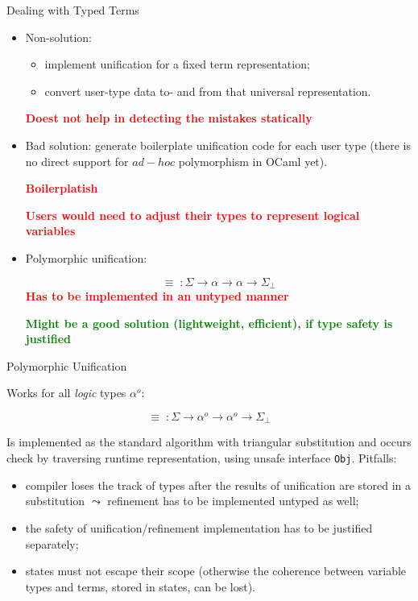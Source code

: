 \documentclass[10pt, mathserif]{beamer}
\newcommand{\oo}[1]{{#1}^o}
\theoremstyle{definition}
\begin{document}
\begin{frame}[fragile]{Dealing with Typed Terms}
\pause
\begin{itemize}
  \item Non-solution: 
     \begin{itemize}
        \item implement unification for a fixed term representation;
        \item convert user-type data to- and from that universal representation.
      \end{itemize}\pause
      {\small\bf\textcolor{red}{Doest not help in detecting the mistakes statically}}\pause 
  \item Bad solution: generate boilerplate unification code for each user type 
      (there is no direct support for $ad-hoc$ polymorphism in OCaml yet).\pause
      
      {\small\textcolor{red}{\bf Boilerplatish}}\pause

      {\small\textcolor{red}{\bf Users would need to adjust their types to represent logical variables}}\pause
  \item Polymorphic unification:

    $$
     \equiv\;\colon \Sigma\to\alpha\to\alpha\to\Sigma_{\perp}
    $$\pause
    \small
    {\bf\textcolor{red}{Has to be implemented in an untyped manner}}
    \pause

    {\bf\textcolor{green}{Might be a good solution (lightweight, efficient), if  
    type safety is justified}}
\end{itemize}

\end{frame}

\begin{frame}[fragile]{Polymorphic Unification}

Works for all \emph{logic} types $\oo{\alpha}$:

$$
\equiv\;\colon \Sigma\to\oo{\alpha}\to\oo{\alpha}\to\Sigma_{\perp}
$$
\pause

Is implemented as the standard algorithm with triangular substitution
and occurs check by traversing runtime representation, using
unsafe interface \lstinline{Obj}.
\pause
\vskip3mm
Pitfalls:

\begin{itemize}
\item compiler loses the track of types after the results of unification
are stored in a substitution $\leadsto$ refinement has to be implemented untyped as well;\pause
\item the safety of unification/refinement implementation has to be justified separately;\pause
\item states must not escape their scope (otherwise the coherence between variable
types and terms, stored in states, can be lost).
\end{itemize}
\end{frame}
\end{document}
